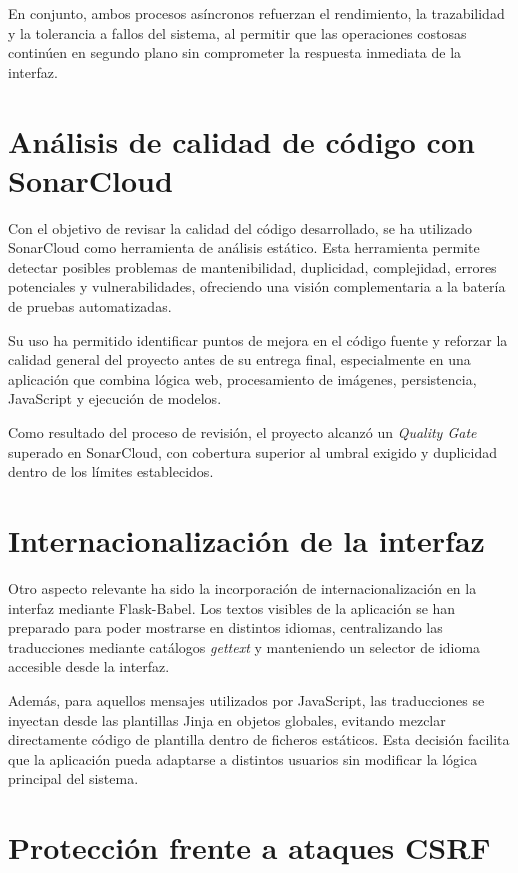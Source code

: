 En conjunto, ambos procesos asíncronos refuerzan el rendimiento, la trazabilidad y la tolerancia a fallos del sistema, al permitir que las operaciones costosas continúen en segundo plano sin comprometer la respuesta inmediata de la interfaz.

\section{Análisis de calidad de código con SonarCloud}

Con el objetivo de revisar la calidad del código desarrollado, se ha utilizado SonarCloud como herramienta de análisis estático. Esta herramienta permite detectar posibles problemas de mantenibilidad, duplicidad, complejidad, errores potenciales y vulnerabilidades, ofreciendo una visión complementaria a la batería de pruebas automatizadas. 

Su uso ha permitido identificar puntos de mejora en el código fuente y reforzar la calidad general del proyecto antes de su entrega final, especialmente en una aplicación que combina lógica web, procesamiento de imágenes, persistencia, JavaScript y ejecución de modelos.

Como resultado del proceso de revisión, el proyecto alcanzó un \textit{Quality Gate} superado en SonarCloud, con cobertura superior al umbral exigido y duplicidad dentro de los límites establecidos.

\section{Internacionalización de la interfaz}

Otro aspecto relevante ha sido la incorporación de internacionalización en la interfaz mediante Flask-Babel. Los textos visibles de la aplicación se han preparado para poder mostrarse en distintos idiomas, centralizando las traducciones mediante catálogos \textit{gettext} y manteniendo un selector de idioma accesible desde la interfaz. 

Además, para aquellos mensajes utilizados por JavaScript, las traducciones se inyectan desde las plantillas Jinja en objetos globales, evitando mezclar directamente código de plantilla dentro de ficheros estáticos. Esta decisión facilita que la aplicación pueda adaptarse a distintos usuarios sin modificar la lógica principal del sistema.

\section{Protección frente a ataques CSRF}

